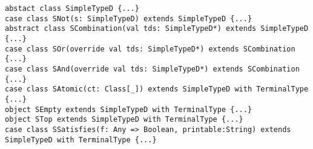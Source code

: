 
\begin{lstlisting}[style=scalaioScala]
abstact class SimpleTypeD {...}
case class SNot(s: SimpleTypeD) extends SimpleTypeD {...}
abstract class SCombination(val tds: SimpleTypeD*) extends SimpleTypeD {...}
case class SOr(override val tds: SimpleTypeD*) extends SCombination {...}
case class SAnd(override val tds: SimpleTypeD*) extends SCombination {...}
case class SAtomic(ct: Class[_]) extends SimpleTypeD with TerminalType {...}
object SEmpty extends SimpleTypeD with TerminalType {...}
object STop extends SimpleTypeD with TerminalType {...}
case class SSatisfies(f: Any => Boolean, printable:String) extends SimpleTypeD with TerminalType {...}
\end{lstlisting}
